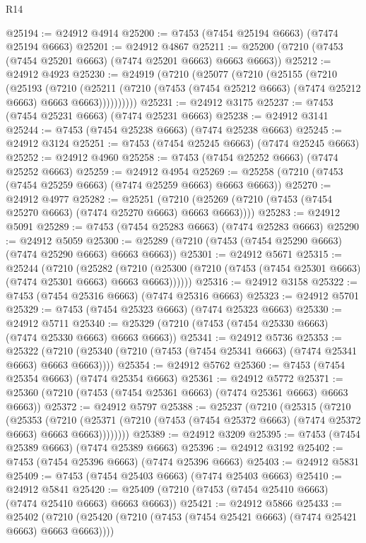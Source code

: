 \begin{lexlean}{R14}
\begin{coremodule}
@25194 := @24912 @4914
@25200 := @7453 (@7454 @25194 @6663) (@7474 @25194 @6663)
@25201 := @24912 @4867
@25211 := @25200 (@7210 (@7453 (@7454 @25201 @6663) (@7474 @25201 @6663) @6663 @6663))
@25212 := @24912 @4923
@25230 := @24919
    (@7210
      (@25077
        (@7210
          (@25155
            (@7210
              (@25193
                (@7210
                  (@25211
                    (@7210 (@7453 (@7454 @25212 @6663) (@7474 @25212 @6663) @6663 @6663))))))))))
@25231 := @24912 @3175
@25237 := @7453 (@7454 @25231 @6663) (@7474 @25231 @6663)
@25238 := @24912 @3141
@25244 := @7453 (@7454 @25238 @6663) (@7474 @25238 @6663)
@25245 := @24912 @3124
@25251 := @7453 (@7454 @25245 @6663) (@7474 @25245 @6663)
@25252 := @24912 @4960
@25258 := @7453 (@7454 @25252 @6663) (@7474 @25252 @6663)
@25259 := @24912 @4954
@25269 := @25258 (@7210 (@7453 (@7454 @25259 @6663) (@7474 @25259 @6663) @6663 @6663))
@25270 := @24912 @4977
@25282 := @25251
    (@7210 (@25269 (@7210 (@7453 (@7454 @25270 @6663) (@7474 @25270 @6663) @6663 @6663))))
@25283 := @24912 @5091
@25289 := @7453 (@7454 @25283 @6663) (@7474 @25283 @6663)
@25290 := @24912 @5059
@25300 := @25289 (@7210 (@7453 (@7454 @25290 @6663) (@7474 @25290 @6663) @6663 @6663))
@25301 := @24912 @5671
@25315 := @25244
    (@7210
      (@25282
        (@7210 (@25300 (@7210 (@7453 (@7454 @25301 @6663) (@7474 @25301 @6663) @6663 @6663))))))
@25316 := @24912 @3158
@25322 := @7453 (@7454 @25316 @6663) (@7474 @25316 @6663)
@25323 := @24912 @5701
@25329 := @7453 (@7454 @25323 @6663) (@7474 @25323 @6663)
@25330 := @24912 @5711
@25340 := @25329 (@7210 (@7453 (@7454 @25330 @6663) (@7474 @25330 @6663) @6663 @6663))
@25341 := @24912 @5736
@25353 := @25322
    (@7210 (@25340 (@7210 (@7453 (@7454 @25341 @6663) (@7474 @25341 @6663) @6663 @6663))))
@25354 := @24912 @5762
@25360 := @7453 (@7454 @25354 @6663) (@7474 @25354 @6663)
@25361 := @24912 @5772
@25371 := @25360 (@7210 (@7453 (@7454 @25361 @6663) (@7474 @25361 @6663) @6663 @6663))
@25372 := @24912 @5797
@25388 := @25237
    (@7210
      (@25315
        (@7210
          (@25353
            (@7210
              (@25371 (@7210 (@7453 (@7454 @25372 @6663) (@7474 @25372 @6663) @6663 @6663))))))))
@25389 := @24912 @3209
@25395 := @7453 (@7454 @25389 @6663) (@7474 @25389 @6663)
@25396 := @24912 @3192
@25402 := @7453 (@7454 @25396 @6663) (@7474 @25396 @6663)
@25403 := @24912 @5831
@25409 := @7453 (@7454 @25403 @6663) (@7474 @25403 @6663)
@25410 := @24912 @5841
@25420 := @25409 (@7210 (@7453 (@7454 @25410 @6663) (@7474 @25410 @6663) @6663 @6663))
@25421 := @24912 @5866
@25433 := @25402
    (@7210 (@25420 (@7210 (@7453 (@7454 @25421 @6663) (@7474 @25421 @6663) @6663 @6663))))

\end{coremodule}
\end{lexlean}
